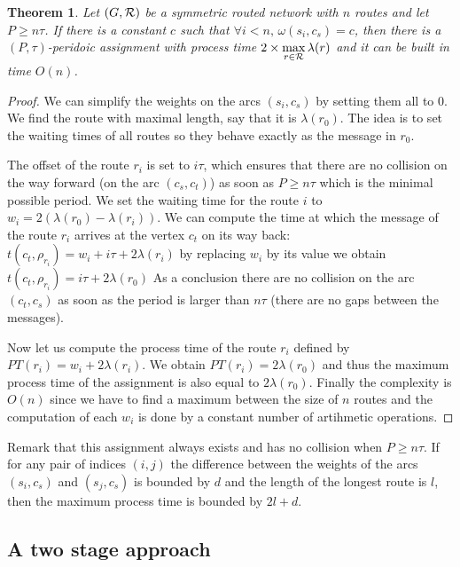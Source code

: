 \documentclass[10pt, conference, letterpaper]{IEEEtran}
\newtheorem{theorem}{Theorem}
\begin{document}
	 \begin{theorem}
	 Let $(G,{\cal R})$ be a symmetric routed network with $n$ routes and let $P \geq n\tau$. If there is a constant $c$ such that $\forall i < n, \,\omega(s_i,c_s) = c$, then there is a $(P,\tau)$-peridoic assignment with process time $2 \times \displaystyle{\max_{r\in {\cal R}} \lambda(r)}$ and it can be built in time $O(n)$.
	 \end{theorem}
      \begin{proof}
      
        We can simplify the weights on the arcs $(s_i,c_s)$ by setting them all to $0$.
        We find the route with maximal length, say that it is $\lambda(r_0)$. The idea is to 
        set the waiting times of all routes so they behave exactly as the message in $r_0$.
        
        The offset of the route $r_i$ is set to $i\tau$, which ensures that there are no collision on the way forward (on the arc $(c_s,c_t)$) as soon as $P \geq n\tau$ which is the minimal possible period. We set the waiting time for the route $i$ to $w_i = 2(\lambda(r_{0}) - \lambda(r_{i}))$. We can compute the time at which the message of the route $r_i$ arrives at the vertex $c_t$ on its way back: $t(c_t,\rho_{r_i}) = w_i + i\tau + 2\lambda(r_{i})$
        by replacing $w_i$ by its value we obtain $t(c_t,\rho_{r_i}) =  i\tau + 2\lambda(r_{0})$
        As a conclusion there are no collision on the arc $(c_t,c_s)$ as soon as the 
        period is larger than $n\tau$ (there are no gaps between the messages).
        
        Now let us compute the process time of the route $r_i$ defined by $PT(r_i) = w_i + 2\lambda(r_{i}) $. We obtain $PT(r_i) = 2\lambda(r_{0})$ and thus the maximum process time of the assignment is also equal to $2\lambda(r_0)$.
	Finally the complexity is $O(n)$ since we have to find a maximum between the size of $n$ routes and the computation of each $w_i$ is done by a constant number of artihmetic operations.
     \end{proof}
     
     Remark that this assignment always exists and has no collision when $P \geq n\tau$. 
     If for any pair of indices $(i,j)$ the difference between the weights of the arcs $(s_i,c_s)$ and $(s_j,c_s)$ is bounded 
     by $d$ and the length of the longest route is $l$, then the maximum process time is bounded by  $2l + d$.

     
     \subsection{A two stage approach}
     
\end{document}

